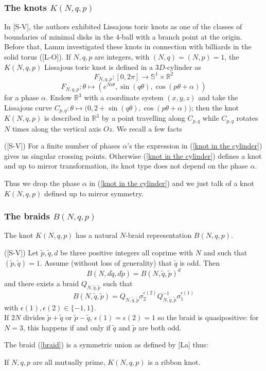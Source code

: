 \documentclass[12pt]{article}
\begin{document}
\subsubsection{The knots $K(N,q,p)$}\label{paragraphe knot}
In [S-V], the authors exhibited Lissajous toric knots as one of the classes of  boundaries of minimal disks in the $4$-ball with a branch point at the origin. Before that, Lamm investigated these knots in connection with billiards in the solid torus ([L-O]). If $N,q,p$ are integers, with $(N,q)=(N,p)=1$, the $K(N,q,p)$ Lissajous toric knot is defined in a $3D$-cylinder as
$$F_{N,q,p}:[0,2\pi]\longrightarrow\mathbb{S}^1\times\mathbb{R}^2$$
\begin{equation}\label{knot in the cylinder}
F_{N,q,p}:\theta\mapsto(e^{Ni\theta},\sin(q\theta),\cos(p\theta+\alpha))
\end{equation}
for a phase $\alpha$.
Endow $\mathbb{R}^3$ with a coordinate  system $(x,y,z)$ and take the Lissajous curve $C_{p,q}:\theta\mapsto \big(0,2+\sin(q\theta),\cos(p\theta+\alpha)\big)$; then the knot $K(N,q,p)$ is described in $\mathbb{R}^3$ by a point travelling along $C_{p,q}$ while $C_{p,q}$ rotates $N$ times along the vertical axis $Oz$.  We recall a few facts
\begin{fact}\label{no phase}([S-V])
	For a finite number of phases $\alpha$'s the expression in (\ref{knot in the cylinder}) gives us singular crossing points. Otherwise (\ref{knot in the cylinder}) defines a knot and up to mirror transformation, its knot type does not depend on the phase $\alpha$.
\end{fact}
Thus we drop the phase $\alpha$ in (\ref{knot in the cylinder}) and we just talk of a knot $K(N,q,p)$ defined up to mirror symmetry.
\subsubsection{The braids $B(N,q,p)$}\label{paragraphe braid}
 The knot $K(N,q,p)$  has a natural $N$-braid representation $B(N,q,p)$.
\begin{fact}\label{description de la tresse}([S-V]) Let $\tilde{p},\tilde{q},d$ be three positive integers all coprime with $N$ and such that $(\tilde{p},\tilde{q})=1$. Assume (without loss of generality) that $\tilde{q}$ is odd. Then
	$$B(N,d\tilde{q},d\tilde{p})=B(N,\tilde{q},\tilde{p})^d$$
	and there exists a braid $Q_{N,\tilde{q},\tilde{p}}$ such that 
	\begin{equation}\label{braid}
	B(N,\tilde{q},\tilde{p})=Q_{N,\tilde{q},\tilde{p}}\sigma_2^{\epsilon(2)}Q_{N,\tilde{q},\tilde{p}}^{-1}\sigma_1^{\epsilon(1)}
	\end{equation}
	with $\epsilon(1), \epsilon(2)\in\{-1,1\}$.\\
	If $2N$ divides $\tilde{p}+\tilde{q}$ or $\tilde{p}-\tilde{q}$, $\epsilon(1)= \epsilon(2)=1$ so the braid is quasipositive: for $N=3$, this happens if and only if $\tilde{q}$ and $\tilde{p}$ are both odd.
\end{fact}
The braid (\ref{braid}) is a symmetric union as defined by [La] thus: 
\begin{fact}\label{fact ribbon}
	If $N,q,p$ are all mutually prime, $K(N,q,p)$ is a ribbon knot.
\end{fact}
\end{document}
